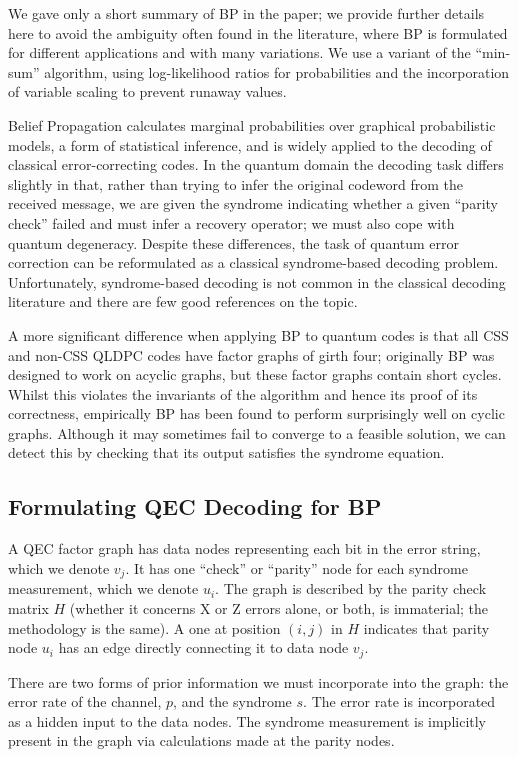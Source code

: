 We gave only a short summary of BP in the paper; we provide further details here to avoid the ambiguity often found in the literature, where BP is formulated for different applications and with many variations. We use a variant of the ``min-sum'' algorithm, using log-likelihood ratios for probabilities and the incorporation of variable scaling to prevent runaway values.
 
Belief Propagation calculates marginal probabilities over graphical probabilistic models, a form of statistical inference, and is widely applied to the decoding of classical error-correcting codes. In the quantum domain the decoding task differs slightly in that, rather than trying to infer the original codeword from the received message, we are given the syndrome indicating whether a given ``parity check'' failed and must infer a recovery operator; we must also cope with quantum degeneracy. Despite these differences, the task of quantum error correction can be reformulated as a classical syndrome-based decoding problem. Unfortunately,  syndrome-based decoding is not common in the classical decoding literature and there are few good references on the topic.

A more significant difference when applying BP to quantum codes is that all CSS and non-CSS QLDPC codes have factor graphs of girth four; originally BP was designed to work on acyclic graphs, but these factor graphs contain short cycles. Whilst this violates the invariants of the algorithm and hence its proof of its correctness, empirically BP has been found to perform surprisingly well on cyclic graphs. Although it may sometimes fail to converge to a feasible solution, we can detect this by checking that its output satisfies the syndrome equation.

\subsection*{Formulating QEC Decoding for BP}
A QEC factor graph has data nodes representing each bit in the error string, which we denote $v_j$. It has one ``check'' or ``parity'' node for each syndrome measurement, which we denote $u_i$. The graph is described by the parity check matrix $H$ (whether it concerns X or Z errors alone, or both, is immaterial; the methodology is the same). A one at position $(i, j)$ in $H$ indicates that parity node $u_i$ has an edge directly connecting it to data node $v_j$.

There are two forms of prior information we must incorporate into the graph: the error rate of the channel, $p$, and the syndrome $s$. The error rate is incorporated as a hidden input to the data nodes. The syndrome measurement is implicitly present in the graph via calculations made at the parity nodes.

